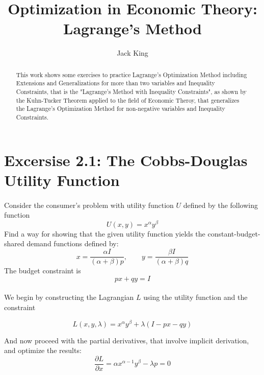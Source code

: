 \documentclass{article}
\author{Jack King}
\title{Optimization in Economic Theory:\\Lagrange's Method}
\begin{document}
\maketitle

\medskip

\begin{abstract}
This work shows some exercises to practice Lagrange's Optimization Method including Extensions and Generalizations for more than two variables and Inequality Constraints, that is the "Lagrange's Method with Inequality Constraints", as shown by the Kuhn-Tucker Theorem applied to the field of Economic Theroy, that generalizes the Lagrange's Optimization Method for non-negative variables and Inequality Constraints.
\end{abstract}

\bigskip

\section*{Excersise 2.1: The Cobbs-Douglas Utility Function}
\paragraph{}
Consider the consumer's problem with utility function $U$ defined by the following function
  \begin{equation}
    U(x, y) = x^\alpha y^\beta
  \end{equation}
Find a way for showing that the given utility function yields the constant-budget-shared demand functions defined by:
  \begin{equation}\label{df}
    x = \frac{\alpha I}{(\alpha + \beta)p}, \qquad y = \frac{\beta I}{(\alpha + \beta)q}
  \end{equation}
The budget constraint is
  \begin{equation}
    px + qy = I
  \end{equation}

\paragraph{}
We begin by constructing the Lagrangian $L$ using the utility function and the constraint

  \begin{equation}
     L(x, y, \lambda) = x^\alpha y^\beta + \lambda (I - px - qy)
  \end{equation}

And now proceed with the partial derivatives, that involve implicit derivation, and optimize the results:
  \begin{equation}
    \frac{\partial L}{\partial x} = \alpha x^{\alpha - 1} y^\beta - \lambda p = 0
  \end{equation}
\end{document}
